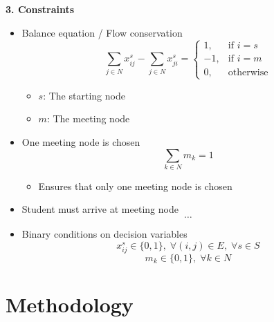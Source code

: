 \documentclass[12pt]{report}
\begin{document}
\textbf{3. Constraints}
\begin{itemize}
    \item Balance equation / Flow conservation
    $$\sum_{j \in N} x^s_{ij} - \sum_{j \in N} x^s_{ji} = \begin{cases}
        1, & \text{if } i=s\\
        -1, & \text{if } i=m\\
        0, & \text{otherwise}
    \end{cases}$$
    \begin{itemize}
        \item $s$: The starting node
        \item $m$: The meeting node
    \end{itemize}

    \item One meeting node is chosen
    $$\sum_{k \in N} m_k =1$$
    \begin{itemize}
        \item Ensures that only one meeting node is chosen
    \end{itemize}

    \item Student must arrive at meeting node
    $$\dots$$

    \item Binary conditions on decision variables
    $$x^s_{ij} \in \{0,1\}, \; \forall (i,j) \in E, \; \forall s \in S$$
    $$m_k \in \{0,1\}, \; \forall k \in N$$
\end{itemize}


\section{Methodology}
\end{document}
